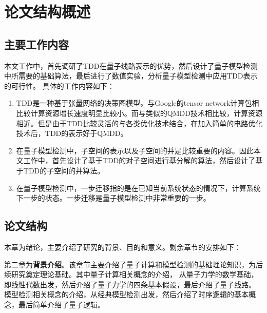 \section{论文结构概述}

\subsection*{主要工作内容}
本文工作中，首先调研了TDD在量子线路表示的优势，然后设计了量子模型检测中所需要的基础算法，最后进行了数值实验，分析量子模型检测中应用TDD表示的可行性。
具体的工作内容如下：
\begin{enumerate}
    \item TDD是一种基于张量网络的决策图模型。与Google的tensor network计算包相比较计算资源增长速度明显比较小。而与类似的QMDD技术相比较，计算资源相近。但是由于TDD比较灵活的与各类优化技术结合，在加入简单的电路优化技术后，TDD的表示好于QMDD。
    \item 在量子模型检测中，子空间的表示以及子空间的并是比较重要的内容。因此本文工作中，首先设计了基于TDD的对子空间进行基分解的算法，然后设计了基于TDD的子空间的并算法。
    \item 在量子模型检测中，一步迁移指的是在已知当前系统状态的情况下，计算系统下一步的状态。一步迁移是量子模型检测中非常重要的一步。
\end{enumerate}

\subsection*{论文结构}
本章为绪论，主要介绍了研究的背景、目的和意义。剩余章节的安排如下：

第二章为\textbf{背景介绍}。该章节主要介绍了量子计算和模型检测的基础理论知识，为后续研究奠定理论基础。其中量子计算相关概念的介绍，
从量子力学的数学基础，即线性代数出发，然后介绍了量子力学的四条基本假设，最后介绍了量子线路。
模型检测相关概念的介绍，从经典模型检测出发，然后介绍了时序逻辑的基本概念，最后简单介绍了量子逻辑。

